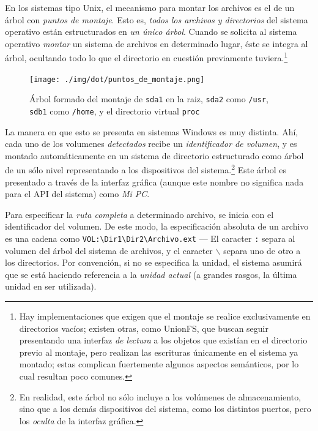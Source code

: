\documentclass[11pt,fleqn]{book} %
\begin{document}
En los sistemas tipo Unix, el mecanismo para montar los archivos es el
de un árbol con \emph{puntos de montaje}. Esto es, \emph{todos los archivos y directorios} del sistema operativo están estructurados en \emph{un único árbol}. Cuando se solicita al sistema operativo \emph{montar} un
sistema de archivos en determinado lugar, éste se integra al árbol,
ocultando todo lo que el directorio en cuestión previamente
tuviera.\footnote{Hay implementaciones que exigen que el montaje se realice
exclusivamente en directorios vacíos; existen otras, como UnionFS, que
buscan seguir presentando una interfaz \emph{de lectura} a los objetos que
existían en el directorio previo al montaje, pero realizan las
escrituras únicamente en el sistema ya montado; estas complican
fuertemente algunos aspectos semánticos, por lo cual resultan poco
comunes. }

\begin{figure}[htb]
\centering
\texttt{[image: ./img/dot/puntos\_de\_montaje.png]}
\caption{\label{DIR_puntos_de_montaje}Árbol formado del montaje de \texttt{sda1} en la raiz, \texttt{sda2} como \texttt{/usr}, \texttt{sdb1} como \texttt{/home}, y el directorio virtual \texttt{proc}}
\end{figure}

La manera en que esto se presenta en sistemas Windows es muy
distinta. Ahí, cada uno de los volumenes \emph{detectados}
recibe un \emph{identificador de volumen}, y es montado automáticamente en
un sistema de directorio estructurado como árbol de un sólo nivel
representando a los dispositivos del sistema.\footnote{En realidad, este
árbol no sólo incluye a los volúmenes de almacenamiento, sino que a
los demás dispositivos del sistema, como los distintos puertos, pero
los \emph{oculta} de la interfaz gráfica. } Este árbol es presentado a
través de la interfaz gráfica (aunque este nombre no significa nada
para el API del sistema) como \emph{Mi PC}.

Para especificar la \emph{ruta completa} a determinado archivo, se inicia
con el identificador del volumen. De este modo, la especificación absoluta de un archivo es
una cadena como \texttt{VOL:\textbackslash{}Dir1\textbackslash{}Dir2\textbackslash{}Archivo.ext} — El caracter \texttt{:} separa
al volumen del árbol del sistema de archivos, y el caracter
$\backslash$ separa uno de otro a los directorios. Por convención, si
no se especifica la unidad, el sistema asumirá que se está haciendo
referencia a la \emph{unidad actual} (a grandes rasgos, la última unidad en
ser utilizada).
\end{document}
